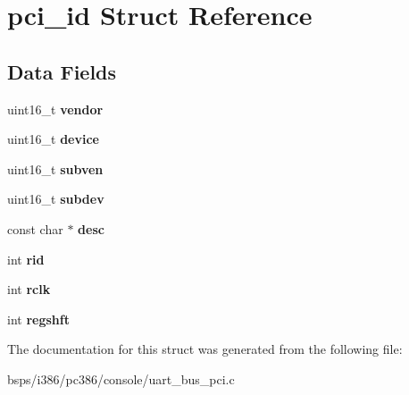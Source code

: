 \hypertarget{structpci__id}{}\section{pci\+\_\+id Struct Reference}
\label{structpci__id}
\subsection*{Data Fields}
\begin{DoxyCompactItemize}
\item 
\mbox{\label{structpci__id_a876347cde8aaa6bb3813f074b2a2ffc9}} 
uint16\+\_\+t {\bfseries vendor}
\item 
\mbox{\label{structpci__id_a0f16cc1444c4db5b7975e9129356190a}} 
uint16\+\_\+t {\bfseries device}
\item 
\mbox{\label{structpci__id_a6647f41dd2e2e34e447eb31962f97dfe}} 
uint16\+\_\+t {\bfseries subven}
\item 
\mbox{\label{structpci__id_a2068b8e927a825aaf949cf1386106669}} 
uint16\+\_\+t {\bfseries subdev}
\item 
\mbox{\label{structpci__id_ae4b5172224a9c463f0b1c25d4227a18b}} 
const char $\ast$ {\bfseries desc}
\item 
\mbox{\label{structpci__id_a268c00bef9c0424ce725349c62cefe0b}} 
int {\bfseries rid}
\item 
\mbox{\label{structpci__id_aa0fe9019285ea3a04128c35d7e1857bd}} 
int {\bfseries rclk}
\item 
\mbox{\label{structpci__id_a83d9ed35f802ce34579215f6c3dfea2c}} 
int {\bfseries regshft}
\end{DoxyCompactItemize}


The documentation for this struct was generated from the following file\+:\begin{DoxyCompactItemize}
\item 
bsps/i386/pc386/console/uart\+\_\+bus\+\_\+pci.\+c\end{DoxyCompactItemize}
